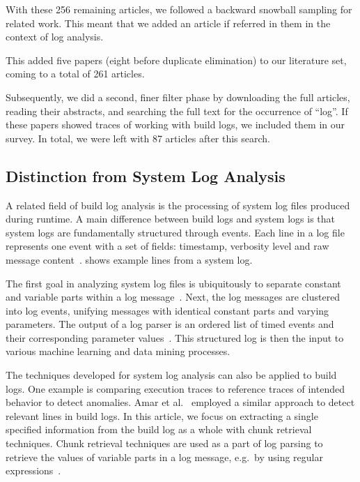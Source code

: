 With these 256 remaining articles, we followed a backward snowball
sampling for related work.
This meant that we added an article if referred in them in the context
of log analysis.

This added five papers (eight before
duplicate elimination) to our literature set, coming to a total of 261
articles.

Subsequently, we did a second, finer filter phase by downloading the
full articles, reading their abstracts, and searching the full text
for the occurrence of ``log''.
If these papers showed traces of
working with build logs, we included them in our survey.
In total, we
were left with 87 articles after this search.

\subsection{Distinction from System Log Analysis}
\label{sec:system-log-analysis}
A related field of build log analysis is the processing of system log
files produced during runtime.
A main difference between build logs
and system logs is that system logs are fundamentally structured
through events.
Each line in a log file represents one event with a
set of fields: timestamp, verbosity level and raw message
content~\cite{he2017towards}.
 shows
example lines from a system log.

The first goal in analyzing system log files is ubiquitously to
separate constant and variable parts within a log
message~\cite{nagappan2010abstracting,he2017towards}.
Next, the log
messages are clustered into log events, unifying messages with
identical constant parts and varying parameters.
The output of a log
parser is an ordered list of timed events and their corresponding
parameter values~\cite{he2016evaluation}.
This structured log is then
the input to various machine learning and data mining processes.

The techniques developed for system log analysis can also be applied
to build logs.
One example is comparing execution traces to reference
traces of intended behavior to detect anomalies.
Amar et
al.~\cite{amar2019mining} employed a similar approach to detect
relevant lines in build logs.
In this article, we focus on extracting a single specified information
from the build log as a whole with chunk retrieval techniques.
Chunk
retrieval techniques are used as a part of log parsing to retrieve the
values of variable parts in a log message, e.g.\ by using regular
expressions~\cite{nagappan2010abstracting,xu2009detecting}.

